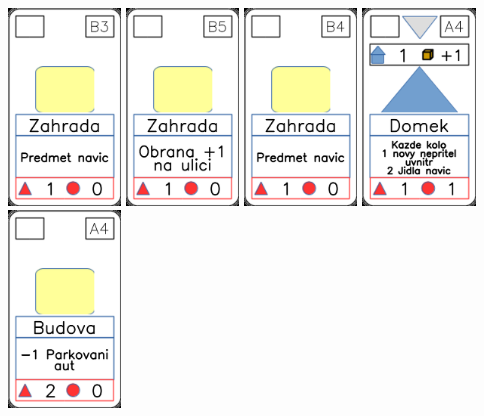 \documentclass[a4paper]{article}
\begin{document}
	\includegraphics[width=3.0cm]{img-2_22}
	\includegraphics[width=3.0cm]{img-2_24}
	\includegraphics[width=3.0cm]{img-2_23}
	\includegraphics[width=3.0cm]{img-3_3}
	\includegraphics[width=3.0cm]{img-2_3}
\end{document}
